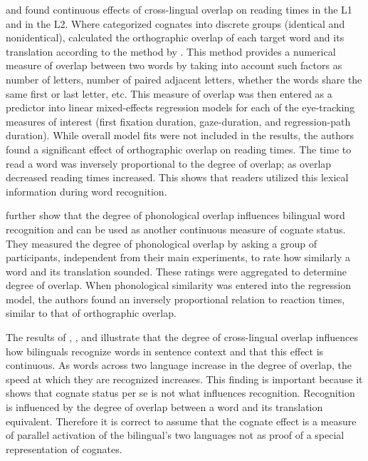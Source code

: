 \textcite{VanAssche2009} and \textcite{VanAssche2010} found continuous effects of cross-lingual overlap on reading times in the L1 and in the L2. Where \textcite{Duyck2007} categorized cognates into discrete groups (identical and nonidentical), \textcite{VanAssche2009} calculated the orthographic overlap of each target word and its translation according to the method by \textcite{VanOrden1987}. This method provides a numerical measure of overlap between two words by taking into account such factors as number of letters, number of paired adjacent letters, whether the words share the same first or last letter, etc. This measure of overlap was then entered as a predictor into linear mixed-effects regression models for each of the eye-tracking measures of interest (first fixation duration, gaze-duration, and regression-path duration). While overall model fits were not included in the results, the authors found a significant effect of orthographic overlap on reading times. The time to read a word was inversely proportional to the degree of overlap; as overlap decreased reading times increased. This shows that readers utilized this  lexical information during word recognition. 

\textcite{VanAssche2010} further show that the degree of phonological overlap influences bilingual word recognition and can be used as another continuous  measure of cognate status. They measured the degree of phonological overlap  by asking a group of participants, independent from their main experiments, to rate how similarly a word and its translation sounded. These ratings were aggregated to determine degree of overlap. When phonological similarity was entered into the regression model, the authors found an inversely proportional relation to reaction times, similar to that of orthographic overlap.

The results of \textcite{Duyck2007}, \textcite{VanAssche2009}, and \textcite{VanAssche2010} illustrate that the degree of cross-lingual overlap  influences how bilinguals recognize words in sentence context and that this effect is continuous. As words across two language increase in the degree of overlap, the speed at which they are recognized increases. This finding is important because it shows that cognate status per se is not what influences recognition. Recognition is influenced by the degree of overlap between a word and its translation equivalent. Therefore it is correct to assume that the cognate effect is a measure of parallel activation of the bilingual's two languages not as proof of a special representation of cognates.

